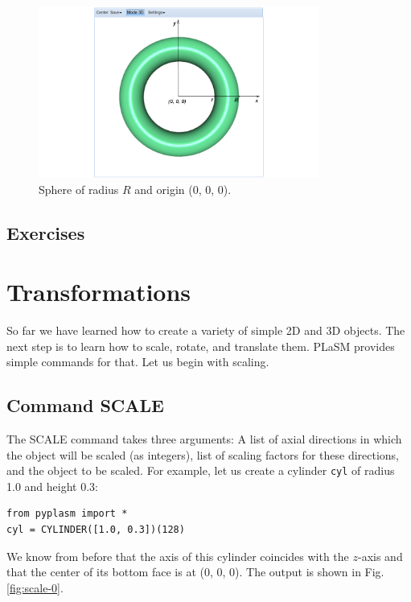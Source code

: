\documentclass[article,A4,12pt]{llncs}
\begin{document}
\begin{figure}[!ht]
\begin{center}
\includegraphics[width=0.82\textwidth]{img/torus-1.png}
\end{center}
\vspace{-2mm}
\caption{Sphere of radius $R$ and origin (0, 0, 0).}
\label{fig:torus-1}
\end{figure}



\subsection{Exercises}

\section{Transformations}

So far we have learned how to create a variety of simple 2D and 3D objects. 
The next step is to learn how to scale, rotate, and translate them. PLaSM
provides simple commands for that. Let us begin with scaling.

\subsection{Command SCALE}

The SCALE command takes three arguments: A list of axial directions in which 
the object will be scaled (as integers), list of scaling factors for these 
directions, and the object to be scaled. For example, let us create a cylinder 
{\tt cyl} of radius 1.0 and height 0.3:

\begin{verbatim}
from pyplasm import *
cyl = CYLINDER([1.0, 0.3])(128)
\end{verbatim}
We know from before that the axis of this cylinder coincides with the $z$-axis 
and that the center of its bottom face is at (0, 0, 0). The output is shown in Fig. \ref{fig:scale-0}.
\end{document}
